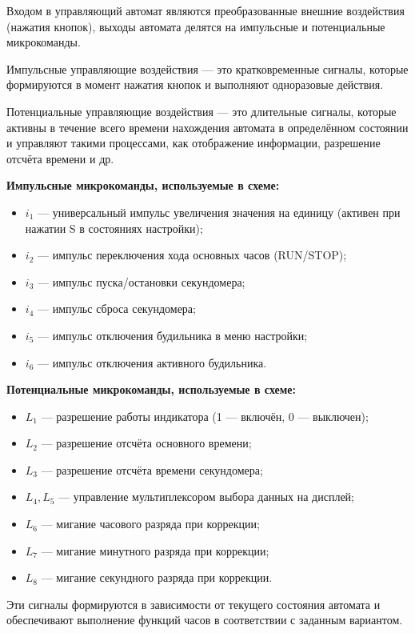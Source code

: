 \documentclass[11pt,a4paper,final]{article}
\begin{document}
	Входом в управляющий автомат являются преобразованные внешние воздействия (нажатия кнопок), выходы автомата делятся на импульсные и потенциальные микрокоманды.
	
	Импульсные управляющие воздействия — это кратковременные сигналы, которые формируются в момент нажатия кнопок и выполняют одноразовые действия.
	
	Потенциальные управляющие воздействия — это длительные сигналы, которые активны в течение всего времени нахождения автомата в определённом состоянии и управляют такими процессами, как отображение информации, разрешение отсчёта времени и др.
	
	\textbf{Импульсные микрокоманды, используемые в схеме:}
	
	\begin{itemize}
		\item \(i_1\) — универсальный импульс увеличения значения на единицу (активен при нажатии S в состояниях настройки);
		\item \(i_2\) — импульс переключения хода основных часов (RUN/STOP);
		\item \(i_3\) — импульс пуска/остановки секундомера;
		\item \(i_4\) — импульс сброса секундомера;
		\item \(i_5\) — импульс отключения будильника в меню настройки;
		\item \(i_6\) — импульс отключения активного будильника.
	\end{itemize}
	
	\textbf{Потенциальные микрокоманды, используемые в схеме:}
	
	\begin{itemize}
		\item \(L_1\) — разрешение работы индикатора (1 — включён, 0 — выключен);
		\item \(L_2\) — разрешение отсчёта основного времени;
		\item \(L_3\) — разрешение отсчёта времени секундомера;
		\item \(L_4, L_5\) — управление мультиплексором выбора данных на дисплей;
		\item \(L_6\) — мигание часового разряда при коррекции;
		\item \(L_7\) — мигание минутного разряда при коррекции;
		\item \(L_8\) — мигание секундного разряда при коррекции.
	\end{itemize}
	
	Эти сигналы формируются в зависимости от текущего состояния автомата и обеспечивают выполнение функций часов в соответствии с заданным вариантом.
	
\end{document}
